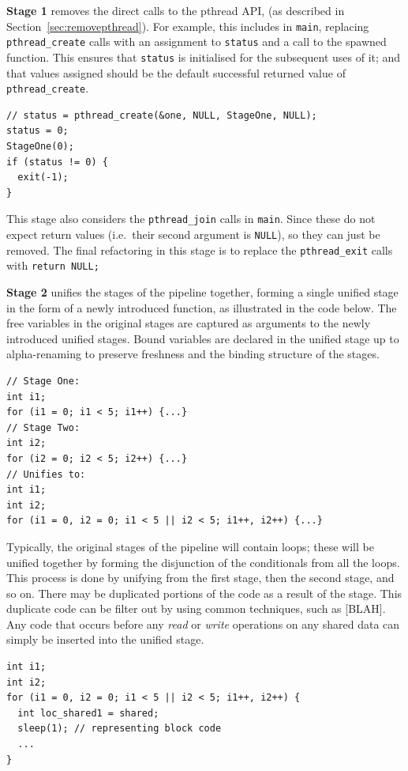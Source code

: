 \textbf{Stage 1} removes the direct calls to the pthread API, (as described in Section~\ref{sec:removepthread}). For example, this includes in \lstinline|main|, replacing \lstinline|pthread_create| calls with an assignment to \lstinline|status| and a call to the spawned function. This ensures that \lstinline|status| is initialised for the subsequent uses of it; and that values assigned should be the default successful returned value of \lstinline|pthread_create|.
\begin{lstlisting}[frame=single]
// status = pthread_create(&one, NULL, StageOne, NULL);
status = 0;
StageOne(0);
if (status != 0) {
  exit(-1);
}
\end{lstlisting}

This stage also considers the \lstinline|pthread_join| calls in \lstinline|main|. Since these do not expect return values (i.e.\ their second argument is \lstinline|NULL|), so they can just be removed.
The final refactoring in this stage is to replace the \lstinline|pthread_exit| calls with \lstinline|return NULL;|

\textbf{Stage 2} unifies the stages of the pipeline together, forming a single unified stage in the form of a newly introduced function, as illustrated in the code below. The free variables in the original stages are captured as arguments to the newly introduced unified stages. Bound variables are declared in the unified stage up to alpha-renaming to preserve freshness and the binding structure of the stages. 

  \begin{lstlisting}[frame=single]
// Stage One:
int i1;
for (i1 = 0; i1 < 5; i1++) {...}
// Stage Two:
int i2;
for (i2 = 0; i2 < 5; i2++) {...}
// Unifies to:
int i1;
int i2;
for (i1 = 0, i2 = 0; i1 < 5 || i2 < 5; i1++, i2++) {...}
\end{lstlisting}

Typically, the original stages of the pipeline will contain loops; these will be unified together by forming the disjunction of the conditionals from all the loops.
 This process is done by unifying from the first stage, then the second stage, and so on. There may be duplicated portions of the code as a result of the stage. This duplicate code can be filter out by using common techniques, such as [BLAH]. Any code that occurs before any \emph{read} or \emph{write} operations on any shared data can simply be inserted into the unified stage. 
 
\begin{lstlisting}[frame=single]
int i1;
int i2;
for (i1 = 0, i2 = 0; i1 < 5 || i2 < 5; i1++, i2++) {
  int loc_shared1 = shared;
  sleep(1); // representing block code
  ...
}
\end{lstlisting}

